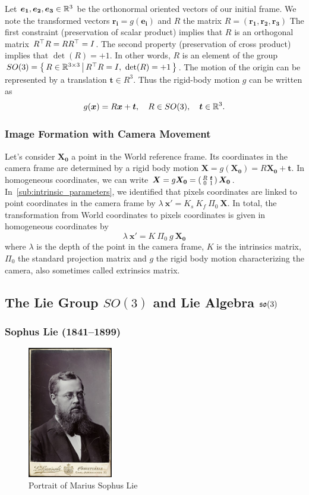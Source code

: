 Let $\bm{e_1}, \bm{e_2}, \bm{e_3} \in \mathbb{R}^3$
be the orthonormal oriented vectors of our initial frame.
We note the transformed vectors $\bm{r_i} = g(\bm{e_i})$
and $R$ the matrix $R = (\bm{r_1}, \bm{r_2}, \bm{r_3})$
The first constraint (preservation of scalar product) implies that
$R$ is an orthogonal matrix $R^{\top}R=RR^{\top}=I$.
The second property (preservation of cross product) implies that $\det(R) = +1$.
In other words, $R$ is an element of the group
$SO(3) = \left\{\, {R \in \mathbb{R}^{3 \times{} 3}} \, \middle| \, {R^{\top}R=I,\ \det(R) = +1} \,\right\}$.
The motion of the origin can be represented by a translation $\bm{t} \in R^3$.
Thus the rigid-body motion $g$ can be written as
\[
	g(\bm{x}) = R\bm{x} + \bm{t},\quad R \in SO(3),\quad \bm{t} \in \mathbb{R}^3.
\]

\subsubsection{Image Formation with Camera Movement}%
\label{ssub:projectionWithMovement}

Let's consider $\bm{X_0}$ a point in the World reference frame.
Its coordinates in the camera frame are determined by a rigid body motion
$\bm{X} = g(\bm{X_0}) = R \bm{X_0} + \bm{t}$.
In homogeneous coordinates, we can write
$\bm{X} = g\bm{X_0} = \left(\begin{smallmatrix}  R & \bm{t}\\ 0 & 1 \end{smallmatrix} \right) \bm{X_0}$.
In~\ref{sub:intrinsic_parameters}, we identified that pixels coordinates
are linked to point coordinates in the camera frame by
$\lambda\ \bm{x'} = K_s\ K_f\ \Pi_0\ \bm{X}$.
In total, the transformation from World coordinates to pixels coordinates
is given in homogeneous coordinates by
\[\boxed{
	\lambda\ \bm{x'} = K\ \Pi_0\ g\ \bm{X_0}
}\]
where $\lambda$ is the depth of the point in the camera frame,
$K$ is the intrinsics matrix, $\Pi_0$ the standard projection matrix
and $g$ the rigid body motion characterizing the camera,
also sometimes called extrinsics matrix.


\subsection{The Lie Group $SO(3)$ and Lie Algebra $\mathfrak{so}(3)$}%
\label{sub:the_lie_group_so_3}


\subsubsection{Sophus Lie (1841--1899)}%
\label{ssub:sophus_lie_1841_1899}

\begin{figure}[ht]
\centering
\includegraphics[width=10em]{assets/img/sophus_lie.jpg}
\caption*{Portrait of Marius Sophus Lie}
\end{figure}

